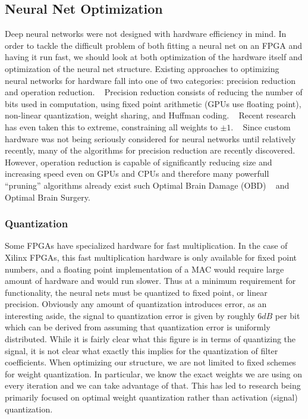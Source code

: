 \subsection{Neural Net Optimization}
Deep neural networks were not designed with hardware efficiency in mind.  In order to tackle the difficult problem of both fitting a neural net on an FPGA and having it run fast, we should look at both optimization of the hardware itself and optimization of the neural net structure.  Existing approaches to optimizing neural networks for hardware fall into one of two categories: precision reduction and operation reduction. ~\cite{DBLP:journals/corr/SzeCYE17}  Precision reduction consists of reducing the number of bits used in computation, using fixed point arithmetic (GPUs use floating point), non-linear quantization, weight sharing, and Huffman coding. ~\cite{DBLP:journals/corr/HanMD15} Recent research has even taken this to extreme, constraining all weights to $\pm 1$. ~\cite{DBLP:journals/corr/CourbariauxB16}  Since custom hardware was not being seriously considered for neural networks until relatively recently, many of the algorithms for precision reduction are recently discovered.  However, operation reduction is capable of significantly reducing size and increasing speed even on GPUs and CPUs and therefore many powerfull ``pruning'' algorithms already exist such Optimal Brain Damage (OBD) ~\cite{Cun:1990:OBD:109230.109298} and Optimal Brain Surgery. ~\cite{Hassibi:1993:OBS:2987189.2987223}

\subsubsection{Quantization}
Some FPGAs have specialized hardware for fast multiplication.  In the case of Xilinx FPGAs, this fast multiplication hardware is only available for fixed point numbers, and a floating point implementation of a MAC would require large amount of hardware and would run slower.  Thus at a minimum requirement for functionality, the neural nets must be quantized to fixed point, or linear precision.  Obviously any amount of quantization introduces error, as an interesting aside, the signal to quantization error is given by roughly $6 dB$ per bit which can be derived from assuming that quantization error is uniformly distributed.  While it is fairly clear what this figure is in terms of quantizing the signal, it is not clear what exactly this implies for the quantization of filter coefficients.  When optimizing our structure, we are not limited to fixed schemes for weight quantization.  In particular, we know the exact weights we are using on every iteration and we can take advantage of that.  This has led to research being primarily focused on optimal weight quantization rather than activation (signal) quantization. ~\cite{DBLP:journals/corr/SzeCYE17}  

